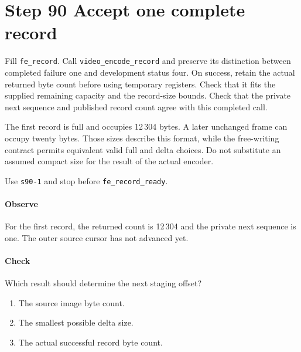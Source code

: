 \section{Step 90 Accept one complete record}
Fill \texttt{fe\_record}. Call \texttt{video\_encode\_record} and preserve its distinction between completed failure one and development status four. On success, retain the actual returned byte count before using temporary registers. Check that it fits the supplied remaining capacity and the record-size bounds. Check that the private next sequence and published record count agree with this completed call.

The first record is full and occupies 12\,304 bytes. A later unchanged frame can occupy twenty bytes. Those sizes describe this format, while the free-writing contract permits equivalent valid full and delta choices. Do not substitute an assumed compact size for the result of the actual encoder.

Use \texttt{s90-1} and stop before \texttt{fe\_record\_ready}.

\paragraph{Observe} For the first record, the returned count is 12\,304 and the private next sequence is one. The outer source cursor has not advanced yet.

\paragraph{Check} Which result should determine the next staging offset?
\begin{enumerate}[label=\Alph*.]
  \item The source image byte count.
  \item The smallest possible delta size.
  \item The actual successful record byte count.
\end{enumerate}

